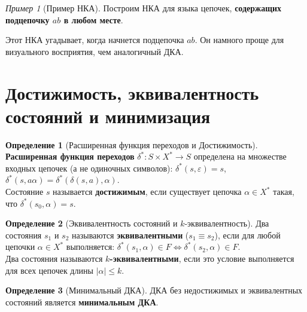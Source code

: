 \documentclass[12pt,a4paper]{article}
\theoremstyle{definition}
\newtheorem{definition}{Определение}
\theoremstyle{plain}
\theoremstyle{remark}
\newtheorem{example}{Пример}
\begin{document}
\begin{example}[Пример НКА]
Построим НКА для языка цепочек, \textbf{содержащих подцепочку $ab$ в любом месте}.
\begin{center}
\end{center}
Этот НКА угадывает, когда начнется подцепочка $ab$. Он намного проще для визуального восприятия, чем аналогичный ДКА.
\end{example}

\section{Достижимость, эквивалентность состояний и минимизация}

\begin{definition}[Расширенная функция переходов и Достижимость]
\textbf{Расширенная функция переходов} $\delta^*: S \times X^* \to S$ определена на множестве входных цепочек (а не одиночных символов): $\delta^*(s, \varepsilon) = s$, $\delta^*(s, a\alpha) = \delta^*(\delta(s, a), \alpha)$. \\
Состояние $s$ называется \textbf{достижимым}, если существует цепочка $\alpha \in X^*$ такая, что $\delta^*(s_0, \alpha) = s$.
\end{definition}

\begin{definition}[Эквивалентность состояний и $k$-эквивалентность]
Два состояния $s_1$ и $s_2$ называются \textbf{эквивалентными} ($s_1 \equiv s_2$), если для любой цепочки $\alpha \in X^*$ выполняется: $\delta^*(s_1, \alpha) \in F \iff \delta^*(s_2, \alpha) \in F$. \\
Два состояния называются \textbf{$k$-эквивалентными}, если это условие выполняется для всех цепочек длины $|\alpha| \le k$.
\end{definition}

\begin{definition}[Минимальный ДКА]
ДКА без недостижимых и эквивалентных состояний является \textbf{минимальным ДКА}.
\end{definition}
\end{document}

